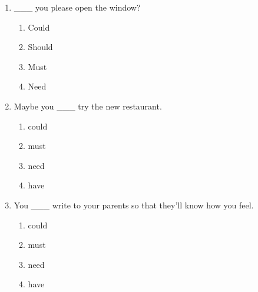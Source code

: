 \documentclass[11pt,a4paper]{ctexart}
\begin{document}
\begin{enumerate}[leftmargin=*,itemsep=4pt]
\begin{enumerate}[label=\Alph*.,leftmargin=2em,itemsep=1pt,topsep=2pt]
\item have
\end{enumerate}
\item \_\_\_ you please open the window?
\begin{enumerate}[label=\Alph*.,leftmargin=2em,itemsep=1pt,topsep=2pt]
\item Could
\item Should
\item Must
\item Need
\end{enumerate}
\item Maybe you \_\_\_ try the new restaurant.
\begin{enumerate}[label=\Alph*.,leftmargin=2em,itemsep=1pt,topsep=2pt]
\item could
\item must
\item need
\item have
\end{enumerate}
\item You \_\_\_ write to your parents so that they’ll know how you feel.
\begin{enumerate}[label=\Alph*.,leftmargin=2em,itemsep=1pt,topsep=2pt]
\item could
\item must
\item need
\item have
\end{enumerate}
\end{enumerate}
\end{document}
